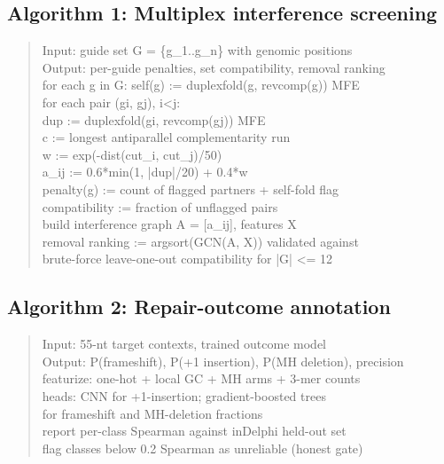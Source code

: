 \documentclass[12pt]{article}
\begin{document}
\subsection*{Algorithm 1: Multiplex interference screening}
\begin{quote}\ttfamily\small
Input: guide set G = \{g\_1..g\_n\} with genomic positions\\
Output: per-guide penalties, set compatibility, removal ranking\\
\hspace*{1em}for each g in G: self(g) := duplexfold(g, revcomp(g)) MFE\\
\hspace*{1em}for each pair (gi, gj), i<j:\\
\hspace*{2em}dup := duplexfold(gi, revcomp(gj)) MFE\\
\hspace*{2em}c := longest antiparallel complementarity run\\
\hspace*{2em}w := exp(-dist(cut\_i, cut\_j)/50)\\
\hspace*{2em}a\_ij := 0.6*min(1, |dup|/20) + 0.4*w\\
\hspace*{1em}penalty(g) := count of flagged partners + self-fold flag\\
\hspace*{1em}compatibility := fraction of unflagged pairs\\
\hspace*{1em}build interference graph A = [a\_ij], features X\\
\hspace*{1em}removal ranking := argsort(GCN(A, X)) validated against\\
\hspace*{2em}brute-force leave-one-out compatibility for |G| <= 12
\end{quote}
\subsection*{Algorithm 2: Repair-outcome annotation}
\begin{quote}\ttfamily\small
Input: 55-nt target contexts, trained outcome model\\
Output: P(frameshift), P(+1 insertion), P(MH deletion), precision\\
\hspace*{1em}featurize: one-hot + local GC + MH arms + 3-mer counts\\
\hspace*{1em}heads: CNN for +1-insertion; gradient-boosted trees\\
\hspace*{2em}for frameshift and MH-deletion fractions\\
\hspace*{1em}report per-class Spearman against inDelphi held-out set\\
\hspace*{1em}flag classes below 0.2 Spearman as unreliable (honest gate)
\end{quote}
\end{document}
